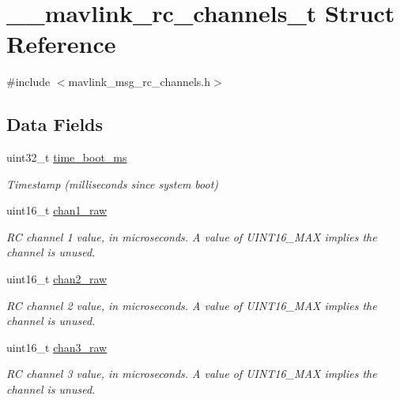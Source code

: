 \hypertarget{struct____mavlink__rc__channels__t}{\section{\+\_\+\+\_\+mavlink\+\_\+rc\+\_\+channels\+\_\+t Struct Reference}
\label{struct____mavlink__rc__channels__t}
}


{\ttfamily \#include $<$mavlink\+\_\+msg\+\_\+rc\+\_\+channels.\+h$>$}

\subsection*{Data Fields}
\begin{DoxyCompactItemize}
\item 
uint32\+\_\+t \hyperlink{struct____mavlink__rc__channels__t_ab33b6c744bb0806ebe7ceb28795efe2e}{time\+\_\+boot\+\_\+ms}
\begin{DoxyCompactList}\small\item\em Timestamp (milliseconds since system boot) \end{DoxyCompactList}\item 
uint16\+\_\+t \hyperlink{struct____mavlink__rc__channels__t_a443cc0fbb7f76e0dc68f91a1f5aad6b7}{chan1\+\_\+raw}
\begin{DoxyCompactList}\small\item\em R\+C channel 1 value, in microseconds. A value of U\+I\+N\+T16\+\_\+\+M\+A\+X implies the channel is unused. \end{DoxyCompactList}\item 
uint16\+\_\+t \hyperlink{struct____mavlink__rc__channels__t_a91f17bfc86bdc4338534a59208604379}{chan2\+\_\+raw}
\begin{DoxyCompactList}\small\item\em R\+C channel 2 value, in microseconds. A value of U\+I\+N\+T16\+\_\+\+M\+A\+X implies the channel is unused. \end{DoxyCompactList}\item 
uint16\+\_\+t \hyperlink{struct____mavlink__rc__channels__t_ab294506b06bd9c4cd0995024ca6aa8b7}{chan3\+\_\+raw}
\begin{DoxyCompactList}\small\item\em R\+C channel 3 value, in microseconds. A value of U\+I\+N\+T16\+\_\+\+M\+A\+X implies the channel is unused. \end{DoxyCompactList}\item 

\end{DoxyCompactItemize}
